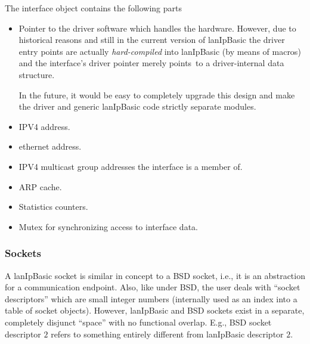 \documentclass{article}
\newcommand{\lip}{lanIpBasic}
\newcommand{\ethn}{ethernet}
\begin{document}
The interface object contains the following parts
\begin{itemize}
\item Pointer to the driver software which handles the hardware. However,
      due to historical reasons and still in the current version of \lip{}
      the driver entry points are actually {\em hard-compiled} into \lip{}
      (by means of macros) and the interface's driver pointer merely points\
      to a driver-internal data structure. 

      In the future, it would be easy to completely upgrade this design
      and make the driver and generic \lip{} code strictly separate modules.
\item IPV4 address.
\item \ethn{} address.
\item IPV4 multicast group addresses the interface is a member of.
\item ARP cache.
\item Statistics counters.
\item Mutex for synchronizing access to interface data.
\end{itemize}

    \subsubsection{Sockets}
A \lip{} socket is similar in concept to a BSD socket, i.e., it is
an abstraction for a communication endpoint. Also, like under BSD,
the user deals with ``socket descriptors'' which are small integer
numbers (internally used as an index into a table of socket objects).
However, \lip{} and BSD sockets exist in a separate, completely
disjunct ``space'' with no functional overlap. E.g., BSD socket
descriptor $2$ refers to something entirely different from \lip{}
descriptor $2$.
\end{document}
